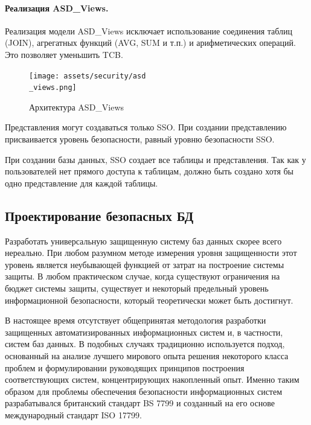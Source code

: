 \paragraph{Реализация ASD\_Views.}

Реализация модели ASD\_Views исключает использование соединения таблиц (JOIN), 
агрегатных функций (AVG, SUM и т.п.) и арифметических операций. Это позволяет уменьшить TCB.
\begin{figure}[H]
    \centering
    \texttt{[image: assets/security/asd\\\_views.png]}
    \caption{Архитектура ASD\_Views}
\end{figure}

Представления могут создаваться только SSO. При создании представлению присваивается уровень безопасности, 
равный уровню безопасности SSO.

При создании базы данных, SSO создает все таблицы и представления. Так как у пользователей нет прямого доступа к таблицам, 
должно быть создано хотя бы одно представление для каждой таблицы.

\subsection{Проектирование безопасных БД}
Разработать универсальную защищенную систему баз данных скорее всего нереально. При любом
разумном методе измерения уровня защищенности этот уровень является неубывающей функцией
от затрат на построение системы защиты. В любом практическом случае, когда существуют
ограничения на бюджет системы защиты, существует и некоторый предельный уровень
информационной безопасности, который теоретически может быть достигнут.

В настоящее время отсутствует общепринятая методология разработки защищенных
автоматизированных информационных систем и, в частности, систем баз данных. В подобных
случаях традиционно используется подход, основанный на анализе лучшего мирового опыта
решения некоторого класса проблем и формулировании руководящих принципов построения
соответствующих систем, концентрирующих накопленный опыт. Именно таким образом для проблемы
обеспечения безопасности информационных систем разрабатывался британский стандарт BS 7799
и созданный на его основе международный стандарт ISO 17799.

